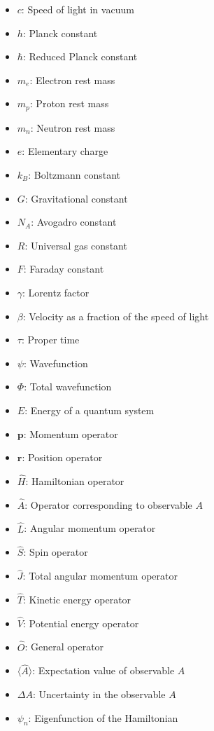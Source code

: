 \documentclass[class=book, crop=false]{standalone}
\begin{document}
\begin{itemize}
    \item $c$: Speed of light in vacuum
    \item $h$: Planck constant
    \item $\hbar$: Reduced Planck constant
    \item $m_e$: Electron rest mass
    \item $m_p$: Proton rest mass
    \item $m_n$: Neutron rest mass
    \item $e$: Elementary charge
    \item $k_B$: Boltzmann constant
    \item $G$: Gravitational constant
    \item $N_A$: Avogadro constant
    \item $R$: Universal gas constant
    \item $F$: Faraday constant
    \item $\gamma$: Lorentz factor
    \item $\beta$: Velocity as a fraction of the speed of light
    \item $\tau$: Proper time
    \item $\psi$: Wavefunction
    \item $\Phi$: Total wavefunction
    \item $E$: Energy of a quantum system
    \item $\mathbf{p}$: Momentum operator
    \item $\mathbf{r}$: Position operator
    \item $\hat{H}$: Hamiltonian operator
    \item $\hat{A}$: Operator corresponding to observable $A$
    \item $\hat{L}$: Angular momentum operator
    \item $\hat{S}$: Spin operator
    \item $\hat{J}$: Total angular momentum operator
    \item $\hat{T}$: Kinetic energy operator
    \item $\hat{V}$: Potential energy operator
    \item $\hat{O}$: General operator
    \item $\langle \hat{A} \rangle$: Expectation value of observable $A$
    \item $\Delta A$: Uncertainty in the observable $A$
    \item $\psi_n$: Eigenfunction of the Hamiltonian

\end{itemize}
\end{document}
